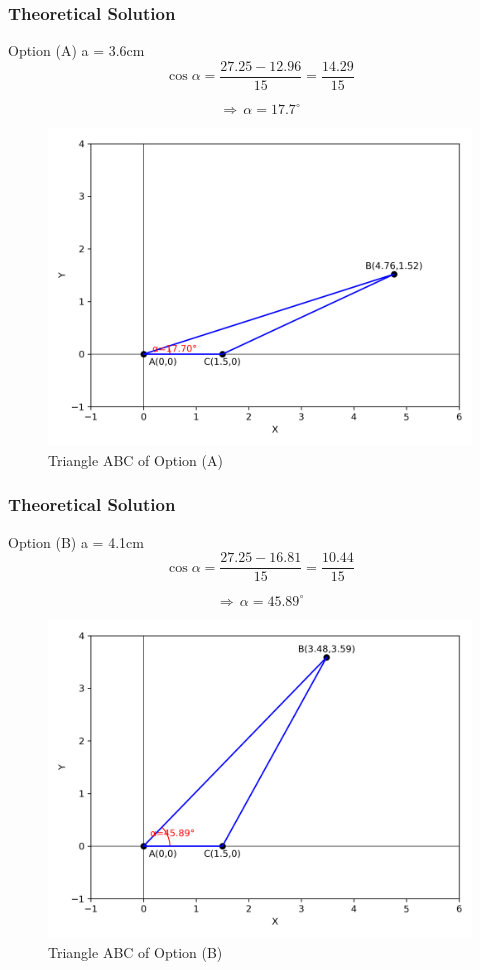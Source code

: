 \documentclass{beamer}
\begin{document}
\begin{frame}[fragile]
    \frametitle{Theoretical Solution}
    Option (A) a = 3.6cm
\begin{equation}
    \cos\alpha = \dfrac{27.25 - 12.96}{15} = \dfrac{14.29}{15}
\end{equation}

 \begin{equation}
\Rightarrow \, \alpha = 17.7^\circ     
 \end{equation}

\begin{figure}[htbp]
    \centering
    \includegraphics[width=0.6\columnwidth]{figs/fig1.png}
    \caption{Triangle ABC of Option (A)}
    \label{fig:placeholder}
\end{figure}
\end{frame}

\begin{frame}[fragile]
    \frametitle{Theoretical Solution}
Option (B) a = 4.1cm
\begin{equation}
    \cos\alpha = \dfrac{27.25 - 16.81}{15} = \dfrac{10.44}{15}
\end{equation}

 \begin{equation}
\Rightarrow \, \alpha = 45.89^\circ     
 \end{equation}

\begin{figure}[htbp]
    \centering
    \includegraphics[width=0.6\columnwidth]{figs/fig2.png}
    \caption{Triangle ABC of Option (B)}
    \label{fig:placeholder}
\end{figure}
\end{frame}
\end{document}
